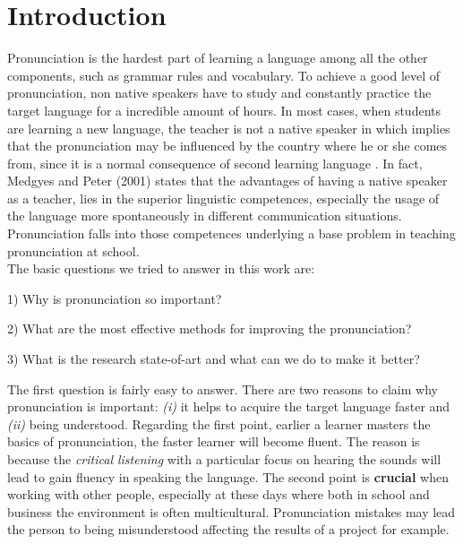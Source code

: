 \chapter{Introduction}
\label{ch:introduction}
Pronunciation is the hardest part of learning a language among all the other components, such as grammar rules and vocabulary. To achieve a good level of pronunciation, non native speakers have to study and constantly practice the target language for a incredible amount of hours. In most cases, when students are learning a new language, the teacher is not a native speaker in which implies that the pronunciation may be influenced by the country where he or she comes from, since it is a normal consequence of second learning language \cite{derwing2005second}. In fact, Medgyes and Peter (2001) states that the advantages of having a native speaker as a teacher, lies in the superior linguistic competences, especially the usage of the language more spontaneously in different communication situations. Pronunciation falls into those competences underlying a base problem in teaching pronunciation at school. \\
\noindent The basic questions we tried to answer in this work are:
\begin{compactitem}
    \item[1)] Why is pronunciation so important?
    \item[2)] What are the most effective methods for improving the pronunciation?
    \item[3)] What is the research state-of-art and what can we do to make it better?
\end{compactitem}

\vspace*{1em}

\noindent The first question is fairly easy to answer. There are two reasons to claim why pronunciation is important: \textit{(i)} it helps to acquire the target language faster and \textit{(ii)} being understood.
Regarding the first point, earlier a learner masters the basics of pronunciation, the faster learner will become fluent. The reason is because the \textit{critical listening} with a particular focus on hearing the sounds will lead to gain fluency in speaking the language.
The second point is \textbf{crucial} when working with other people, especially at these days where both in school and business the environment is often multicultural. Pronunciation mistakes may lead the person to being misunderstood affecting the results of a project for example. \\

